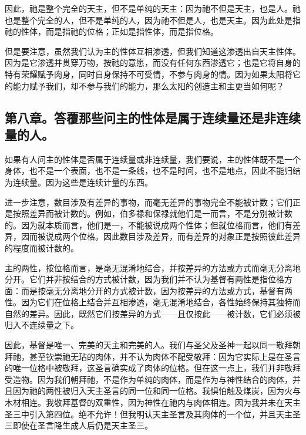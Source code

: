 因此，祂是整个完全的天主，但不是单纯的天主：因为祂不但是天主，也是人。祂也是整个完全的人，但不是单纯的人，因为祂不但是人，也是天主。因为此处是指祂的性体，而是指祂的位格；正如是指性体，而是指位格。\par

但是要注意，虽然我们认为主的性体互相渗透，但我们知道这渗透出自天主性体。因为是它渗透并贯穿万物，按祂的意愿，而没有任何东西渗透它；也是它将自身的特有荣耀赋予肉身，同时自身保持不可受情，不参与肉身的情。因为如果太阳将它的能力赋予我们，却不参与我们的能力，那么太阳的创造主和主更当如何呢？\par


\subsection{第八章。答覆那些问主的性体是属于连续量还是非连续量的人。}

如果有人问主的性体是否属于连续量或非连续量，我们要说，主的性体既不是一个身体，也不是一个表面，也不是一条线，也不是时间，也不是地点，因此不能归结为连续量。因为这些是连续计量的东西。\par

进一步注意，数目涉及有差异的事物，而毫无差异的事物完全不能被计数；它们正是按照差异而被计数的。例如，伯多禄和保禄就他们是一而言，不是分别被计数的。因为就本质而言，他们是一，不能被说成两个性体；但就位格而言，他们有差异，因而被说成两个位格。因此数目涉及差异，而有差异的对象正是按照彼此差异的程度而被计数的。\par

主的两性，按位格而言，是毫无混淆地结合，并按差异的方法或方式而毫无分离地分开。它们并非按结合的方式被计数，因为我们并不认为基督有两性是指位格方面：而是按毫无分离地分开的方式被计数，因为按差异的方法或方式，基督有两性。因为它们在位格上结合并互相渗透，毫无混淆地结合，各性始终保持其独特而自然的差异。因此，既然它们按差异的方式——且仅按此——被计数，它们必须被归入不连续量之下。\par

因此，基督是唯一、完美的天主和完美的人。我们与圣父及圣神一起以同一敬拜朝拜祂，甚至钦崇祂无玷的肉体，并不认为肉体不配受敬拜：因为它实际上是在圣言的唯一位格中被敬拜，这圣言确实成了肉体的位格。但在这一点上，我们并非敬拜受造物。因为我们朝拜祂，不是作为单纯的肉体，而是作为与神性结合的肉体，并且因为祂的两性被归入天主圣言的同一位和同一位格。我惧怕触及煤炭，因为火与木材相连。我敬拜基督的双重性，因为神性在祂内与肉体相连。因为我并未在天主圣三中引入第四位。绝不允许！但我明认天主圣言及其肉体的一个位，并且天主圣三即使在圣言降生成人后仍是天主圣三。\par

